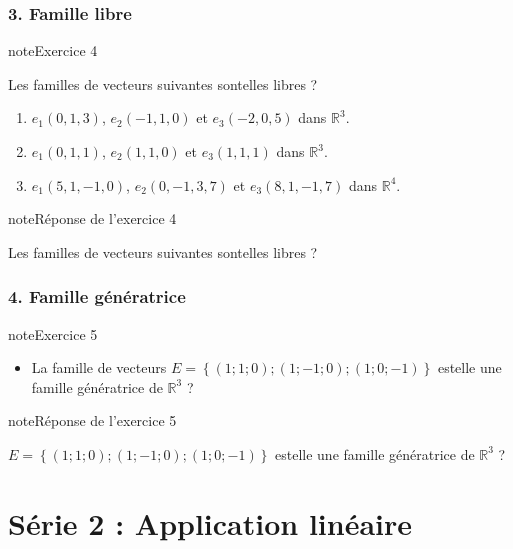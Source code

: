 \documentclass[letterpaper,10pt,french]{jupyterBook}
\begin{document}
\subsection{3. Famille libre}
\label{\detokenize{S_xe9rie1:famille-libre}}
\begin{sphinxadmonition}{note}{Exercice 4}

\sphinxAtStartPar
Les familles de vecteurs suivantes sont\sphinxhyphen{}elles libres ?
\begin{enumerate}
%
\item {} 
\sphinxAtStartPar
\(e_1(0,1,3)\), \(e_2(-1,1,0)\) et \(e_3(-2,0,5)\) dans \(\mathbb{R}^3\).

\item {} 
\sphinxAtStartPar
\(e_1(0,1,1)\), \(e_2(1,1,0)\) et \(e_3(1,1,1)\) dans \(\mathbb{R}^3\).

\item {} 
\sphinxAtStartPar
\(e_1(5,1,-1,0)\), \(e_2(0,-1,3,7)\) et \(e_3(8,1,-1,7)\) dans \(\mathbb{R}^4\).

\end{enumerate}
\end{sphinxadmonition}

\begin{sphinxadmonition}{note}{Réponse de l’exercice 4}

\sphinxAtStartPar
Les familles de vecteurs suivantes sont\sphinxhyphen{}elles libres ?
\end{sphinxadmonition}


\subsection{4. Famille génératrice}
\label{\detokenize{S_xe9rie1:famille-generatrice}}
\begin{sphinxadmonition}{note}{Exercice 5}
\begin{itemize}
\item {} 
\sphinxAtStartPar
La famille de vecteurs \(E = \left\{(1; 1; 0); (1;-1; 0); (1; 0; -1)\right\}\) est\sphinxhyphen{}elle une famille génératrice de \(\mathbb{R}^3\) ? 

\end{itemize}
\end{sphinxadmonition}

\begin{sphinxadmonition}{note}{Réponse de l’exercice 5}

\sphinxAtStartPar
\(E = \left\{(1; 1; 0); (1;-1; 0); (1; 0; -1)\right\}\) est\sphinxhyphen{}elle une famille génératrice de \(\mathbb{R}^3\) ?
\end{sphinxadmonition}

\begin{sphinxVerbatim}[commandchars=\\\{\}]

\end{sphinxVerbatim}


\chapter{Série 2 : Application linéaire}
\label{\detokenize{S_xe9rie2:serie-2-application-lineaire}}\label{\detokenize{S_xe9rie2::doc}}






\renewcommand{\indexname}{Index}
\printindex
\end{document}

